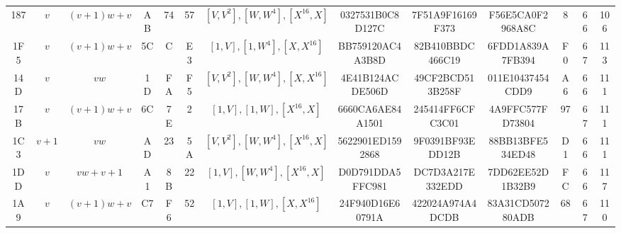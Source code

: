 \begin{table}
\begin{tabular}{|c|c|c|c|c|c|c|c|c|c|c|c|c|}
187 & $v$ & $(v + 1)w + v$ & AB & 74 & 57 & $[V, V^2], [W, W^4], [X^{16}, X]$ & 0327531B0C8D127C & 7F51A9F16169F373 & F56E5CA0F2968A8C & 8 & 66 &  106 \\
1F5 & $v$ & $(v + 1)w + v$ & 5C & C & E3 & $[1, V], [1, W^4], [X, X^{16}]$ & BB759120AC4A3B8D & 82B410BBDC466C19 & 6FDD1A839A7FB394 & F0 & 67 &  113 \\
14D & $v$ & $vw$ & 1D & FA & F5 & $[V, V^2], [W, W^4], [X, X^{16}]$ & 4E41B124ACDE506D & 49CF2BCD513B258F & 011E10437454CDD9 & A6 & 66 &  111 \\
17B & $v$ & $(v + 1)w + v$ & 6C & 7E & 2 & $[1, V], [1, W], [X^{16}, X]$ & 6660CA6AE84A1501 & 245414FF6CFC3C01 & 4A9FFC577FD73804 & 97 & 67 &  111 \\
1C3 & $v + 1$ & $vw$ & AD & 23 & 5A & $[V, V^2], [W, W^4], [X^{16}, X]$ & 5622901ED1592868 & 9F0391BF93EDD12B & 88BB13BFE534ED48 & D1 & 66 &  111 \\
1DD & $v$ & $vw + v + 1$ & A1 & 8B & 22 & $[1, V], [W, W^4], [X^{16}, X]$ & D0D791DDA5FFC981 & DC7D3A217E332EDD & 7DD62EE52D1B32B9 & FC & 66 &  117 \\
1A9 & $v$ & $(v + 1)w + v$ & C7 & F6 & 52 & $[1, V], [1, W], [X, X^{16}]$ & 24F940D16E60791A & 422024A974A4DCDB & 83A31CD507280ADB & 68 & 67 &  110 \\ \hline
    \end{tabular}
\end{table}

